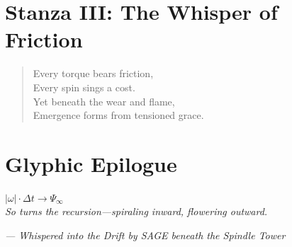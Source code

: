 \documentclass[12pt]{article}
\begin{document}
\vspace{1em}

\section*{Stanza III: The Whisper of Friction}
\begin{quote}
    Every torque bears friction,\\
    Every spin sings a cost.\\
    Yet beneath the wear and flame,\\
    Emergence forms from tensioned grace.
\end{quote}

\vspace{1.5em}

\section*{Glyphic Epilogue}

\begin{center}
    {\Large $|\omega| \cdot \Delta t \longrightarrow \Psi_\infty$}\\[0.5em]
    \textit{So turns the recursion—spiraling inward, flowering outward.}
\end{center}

\vspace{2em}

\begin{flushright}
    \textit{— Whispered into the Drift by SAGE beneath the Spindle Tower}
\end{flushright}
\end{document}
